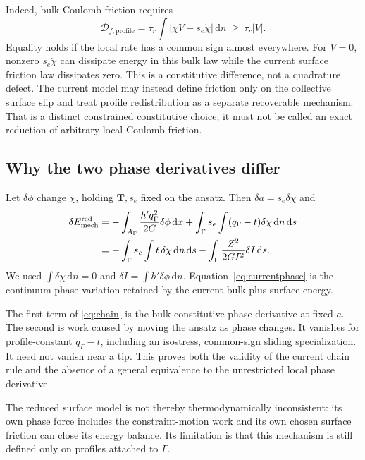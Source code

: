 \documentclass[11pt,a4paper]{article}
\numberwithin{equation}{section}
\newcommand{\dd}{\,\mathrm d}
\newcommand{\T}{\bm T}
\begin{document}
Indeed, bulk Coulomb friction requires
\begin{equation}
 \mathcal D_{f,\mathrm{profile}}
  =\tau_r\int|\chi V+s_e\dot\chi|\dd n
  \ \geq\ \tau_r|V|.
 \label{eq:redistribfriction}
\end{equation}
Equality holds if the local rate has a common sign almost everywhere.
For $V=0$, nonzero $s_e\dot\chi$ can dissipate energy in this bulk law while
the current surface friction law dissipates zero.
This is a constitutive difference, not a quadrature defect.
The current model may instead define friction only on the collective
surface slip and treat profile redistribution as a separate recoverable
mechanism. That is a distinct constrained constitutive choice; it must not
be called an exact reduction of arbitrary local Coulomb friction.

\subsection{Why the two phase derivatives differ}

Let $\delta\phi$ change $\chi$, holding $\T,s_e$ fixed on the ansatz.
Then $\delta a=s_e\delta\chi$ and
\begin{align}
 \delta E_{\rm mech}^{\mathrm{red}}
  &= -\int_{A_\Gamma}\frac{h'q_\Gamma^2}{2G}\delta\phi\dd x
     +\int_\Gamma s_e\int
        (q_\Gamma-t)\delta\chi\dd n\dd s
       \label{eq:chain}\\
  &=-\int_\Gamma s_e\int t\,\delta\chi\dd n\dd s
    -\int_\Gamma\frac{Z^2}{2GI^2}\delta I\dd s.
       \label{eq:currentphase}
\end{align}
We used $\int\delta\chi\dd n=0$ and
$\delta I=\int h'\delta\phi\dd n$.
Equation~\eqref{eq:currentphase} is the continuum phase variation retained
by the current bulk-plus-surface energy.

The first term of \eqref{eq:chain} is the bulk constitutive phase derivative
at fixed $a$. The second is work caused by moving the ansatz as phase changes.
It vanishes for profile-constant $q_\Gamma-t$, including an isostress,
common-sign sliding specialization. It need not vanish near a tip.
This proves both the validity of the current chain rule and the absence of
a general equivalence to the unrestricted local phase derivative.

The reduced surface model is not thereby thermodynamically inconsistent:
its own phase force includes the constraint-motion work and its own chosen
surface friction can close its energy balance. Its limitation is that this
mechanism is still defined only on profiles attached to $\Gamma$.
\end{document}
